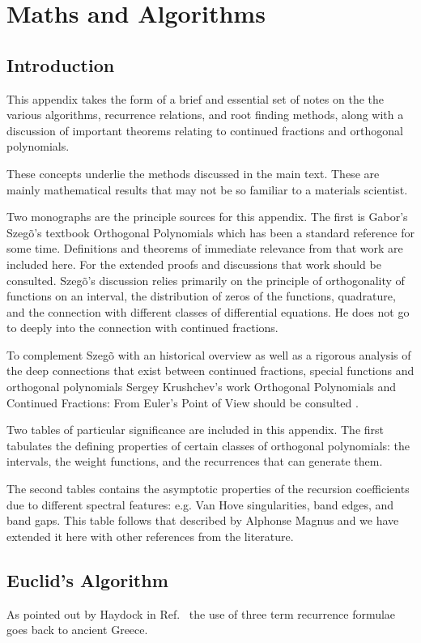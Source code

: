 \chapter{Maths and Algorithms}
\section{Introduction}
This appendix takes the form of a brief and essential
set of notes on the the various algorithms, recurrence relations, and
root finding methods, along with a discussion of important
theorems relating to continued fractions and orthogonal polynomials. 

These concepts underlie the methods discussed in the main text. 
These are mainly mathematical results
that may not be so familiar to a materials scientist.

Two monographs are the principle sources for this appendix. 
The first is Gabor's Szeg\~o's textbook 
Orthogonal Polynomials which has been a standard reference
for some time. Definitions and theorems of immediate relevance 
from that work are included here. For the extended proofs and discussions 
that work should be consulted. Szeg\~o's discussion relies primarily
on the principle of orthogonality of functions on an interval, the distribution
of zeros of the functions, quadrature, and the connection with different
classes of differential equations. He does not go to deeply into the connection 
with continued fractions.

To complement Szeg\~o with an historical overview as well as
a rigorous analysis of the deep
connections that exist between continued fractions, 
special functions and orthogonal polynomials Sergey 
Krushchev's work Orthogonal Polynomials and Continued Fractions: From Euler's Point
of View should be consulted \cite{khrushchev10}. 

Two tables of particular significance are included in this
appendix. The first tabulates 
the defining properties of certain classes of orthogonal polynomials:
the intervals, the weight functions, and the recurrences that can generate
them.

The second tables contains the asymptotic properties 
of the recursion coefficients due to different spectral
features: e.g. Van Hove singularities, band edges, and  band gaps. 
This table follows that described by Alphonse Magnus and we 
have extended it here with other references
from the literature.

\section{Euclid's Algorithm}
As pointed out by Haydock in Ref.~\cite{weaire85} the 
use of three term recurrence formulae goes back to 
ancient Greece. 

